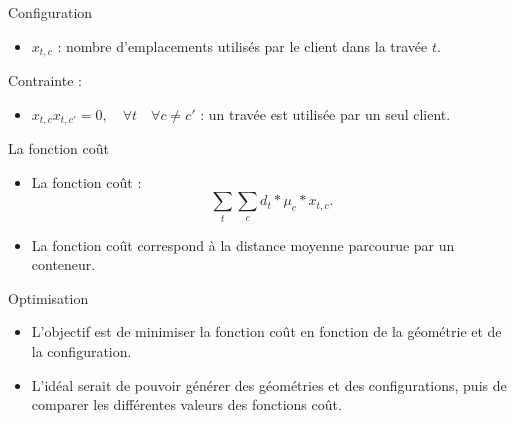 \begin{frame}{Configuration}
  \begin{itemize}
  \item  $x_{t,c}$ : nombre d'emplacements utilisés par le client dans la travée $t$.
  \end{itemize} 
  \vfill Contrainte : 
  \vfill
  \begin{itemize}
  \item $x_{t,c}x_{t,c'}=0,\quad \forall t \quad \forall c\neq c'$ : un travée est utilisée par un seul client.
  \end{itemize}
  \vfill
\end{frame}




\begin{frame}{La fonction coût}
  \vfill
  \begin{itemize}
  \item  La fonction coût  : 
    \vfill
    $$ \sum_t \sum_c d_t* \mu_c* x_{t,c}.  $$
    \vfill
  \item La fonction coût correspond à la distance moyenne parcourue par un conteneur.
  \end{itemize}
  \vfill
\end{frame}

\begin{frame}{Optimisation}
  \vfill
  \begin{itemize}
  \item L'objectif est de minimiser la fonction coût en fonction de la géométrie et de la configuration.
    \vfill
  \item  L'idéal serait de pouvoir générer des géométries et des configurations, puis de comparer les différentes valeurs des fonctions coût. 
  \end{itemize}
  \vfill  
\end{frame}
